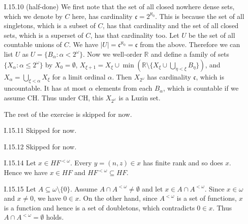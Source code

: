 \documentclass[12pt]{article}
\begin{document}
\begin{customthm}{I.15.10} (half-done)
  We first note that the set of all closed nowhere dense sets, which we denote by $C$ here, has cardinality $\mathfrak{c}=2^{\aleph_0}$. This is because the set of all singletons, which is a subset of $C$, has that cardinality and the set of all closed sets, which is a superset of $C$, has that cardinality too. Let $U$ be the set of all countable unions of $C$. We have $|U|=\mathfrak{c}^{\aleph_0}=\mathfrak{c}$ from the above. Therefore we can list $U$ as $U=\{B_\alpha:\alpha<2^{\omega}\}$. Now we well-order $\mathbb{R}$ and define a family of sets $\{X_\alpha:\alpha\leq2^{\omega}\}$ by $X_0=\emptyset$, $X_{\xi+1}=X_\xi\cup\min(\mathbb{R}\setminus\{X_\xi\cup\bigcup_{\eta<\xi}B_\eta\})$, and $X_{\alpha}=\bigcup_{\xi<\alpha}X_\xi$ for a limit ordinal $\alpha$. Then $X_{2^\omega}$ has cardinality $\mathfrak{c}$, which is uncountable. It has at most $\alpha$ elements from each $B_\alpha$, which is countable if we assume CH. Thus under CH, this $X_{2^\omega}$ is a Luzin set.

  The rest of the exercise is skipped for now.
\end{customthm}

\begin{customthm}{I.15.11}
  Skipped for now.
\end{customthm}

\begin{customthm}{I.15.12}
  Skipped for now.
\end{customthm}

\begin{customthm}{I.15.14}
  Let $x\in HF^{<\omega}$. Every $y=(n,z)\in x$ has finite rank and so does $x$. Hence we have $x\in HF$ and $HF^{<\omega}\subseteq HF$.
\end{customthm}

\begin{customthm}{I.15.15}
  Let $A\subseteq\omega\setminus\{0\}$. Assume $A\cap A^{<\omega}\neq\emptyset$ and let $x\in A\cap A^{<\omega}$. Since $x\in\omega$ and $x\neq 0$, we have $0\in x$. On the other hand, since $A^{<\omega}$ is a set of functions, $x$ is a function and hence is a set of doubletons, which contradicts $0\in x$. Thus $A\cap A^{<\omega}=\emptyset$ holds.
\end{customthm}
\end{document}
